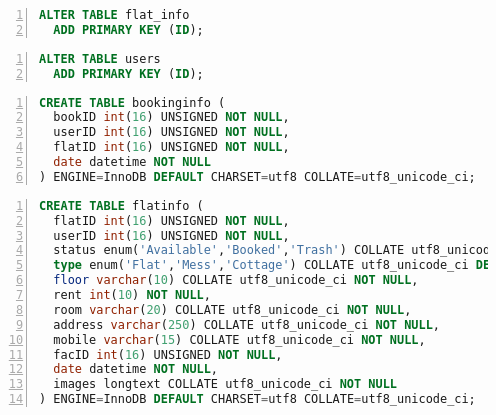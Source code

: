 \begin{lstlisting}[caption={A SQL command for setting primary key. }, label=list:sql, captionpos=b,
           backgroundcolor=\color{white},
           language=SQL,
           breaklines=true,
           frame=single,
           showspaces=false,
           basicstyle=\ttfamily,
           numbers=left,
           numberstyle=\tiny,
           rulecolor=\color{red},
           keywordstyle=\color{blue},
           commentstyle=\color{gray}
        ]		 
 ALTER TABLE flat_info
  ADD PRIMARY KEY (ID);
\end{lstlisting}
\begin{lstlisting}[caption={A SQL command for setting primary key.}, label=list:sql, captionpos=b,
           backgroundcolor=\color{white},
           language=SQL,
           breaklines=true,
           frame=single,
           showspaces=false,
           basicstyle=\ttfamily,
           numbers=left,
           numberstyle=\tiny,
           rulecolor=\color{red},
           keywordstyle=\color{blue},
           commentstyle=\color{gray}
           ]
ALTER TABLE users
  ADD PRIMARY KEY (ID);
\end{lstlisting}
\begin{lstlisting}[caption={A SQL command for Creating table named booking-info}, label=list:sql, captionpos=b,
           backgroundcolor=\color{white},
           language=SQL,
           breaklines=true,
           frame=single,
           showspaces=false,
           basicstyle=\ttfamily,
           numbers=left,
           numberstyle=\tiny,
           rulecolor=\color{red},
           keywordstyle=\color{blue},
           commentstyle=\color{gray}
           ]
CREATE TABLE bookinginfo (
  bookID int(16) UNSIGNED NOT NULL,
  userID int(16) UNSIGNED NOT NULL,
  flatID int(16) UNSIGNED NOT NULL,
  date datetime NOT NULL
) ENGINE=InnoDB DEFAULT CHARSET=utf8 COLLATE=utf8_unicode_ci;
\end{lstlisting}
\begin{lstlisting}[caption={A SQL command for Creating table named Flat-info}, label=list:sql, captionpos=b,
           backgroundcolor=\color{white},
           language=SQL,
           breaklines=true,
           frame=single,
           showspaces=false,
           basicstyle=\ttfamily,
           numbers=left,
           numberstyle=\tiny,
           rulecolor=\color{red},
           keywordstyle=\color{blue},
           commentstyle=\color{gray}
           ]
CREATE TABLE flatinfo (
  flatID int(16) UNSIGNED NOT NULL,
  userID int(16) UNSIGNED NOT NULL,
  status enum('Available','Booked','Trash') COLLATE utf8_unicode_ci DEFAULT 'Available',
  type enum('Flat','Mess','Cottage') COLLATE utf8_unicode_ci DEFAULT 'Flat',
  floor varchar(10) COLLATE utf8_unicode_ci NOT NULL,
  rent int(10) NOT NULL,
  room varchar(20) COLLATE utf8_unicode_ci NOT NULL,
  address varchar(250) COLLATE utf8_unicode_ci NOT NULL,
  mobile varchar(15) COLLATE utf8_unicode_ci NOT NULL,
  facID int(16) UNSIGNED NOT NULL,
  date datetime NOT NULL,
  images longtext COLLATE utf8_unicode_ci NOT NULL
) ENGINE=InnoDB DEFAULT CHARSET=utf8 COLLATE=utf8_unicode_ci;
\end{lstlisting}

